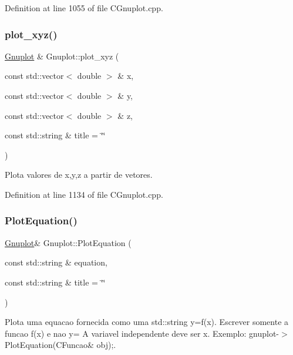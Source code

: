 Definition at line 1055 of file C\+Gnuplot.\+cpp.

\mbox{\label{class_gnuplot_aee30f21a00a4f31c8356a2ef1f0e26e3}} 
\subsubsection{\texorpdfstring{plot\+\_\+xyz()}{plot\_xyz()}}
{\footnotesize\ttfamily \hyperlink{class_gnuplot}{Gnuplot} \& Gnuplot\+::plot\+\_\+xyz (\begin{DoxyParamCaption}\item[{const std\+::vector$<$ double $>$ \&}]{x,  }\item[{const std\+::vector$<$ double $>$ \&}]{y,  }\item[{const std\+::vector$<$ double $>$ \&}]{z,  }\item[{const std\+::string \&}]{title = {\ttfamily \char`\"{}\char`\"{}} }\end{DoxyParamCaption})}



Plota valores de x,y,z a partir de vetores. 



Definition at line 1134 of file C\+Gnuplot.\+cpp.

\mbox{\label{class_gnuplot_a901b030726d78e791f7005acf987bc44}} 
\subsubsection{\texorpdfstring{Plot\+Equation()}{PlotEquation()}}
{\footnotesize\ttfamily \hyperlink{class_gnuplot}{Gnuplot}\& Gnuplot\+::\+Plot\+Equation (\begin{DoxyParamCaption}\item[{const std\+::string \&}]{equation,  }\item[{const std\+::string \&}]{title = {\ttfamily \char`\"{}\char`\"{}} }\end{DoxyParamCaption})\hspace{0.3cm}{\ttfamily [inline]}}



Plota uma equacao fornecida como uma std\+::string y=f(x). Escrever somente a funcao f(x) e nao y= A variavel independente deve ser x. Exemplo\+: gnuplot-\/$>$Plot\+Equation(\+C\+Funcao\& obj);. 



